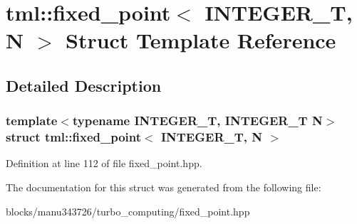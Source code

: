 \hypertarget{structtml_1_1fixed__point}{\section{tml\+:\+:fixed\+\_\+point$<$ I\+N\+T\+E\+G\+E\+R\+\_\+\+T, N $>$ Struct Template Reference}
\label{structtml_1_1fixed__point}
}


\subsection{Detailed Description}
\subsubsection*{template$<$typename I\+N\+T\+E\+G\+E\+R\+\_\+\+T, I\+N\+T\+E\+G\+E\+R\+\_\+\+T N$>$struct tml\+::fixed\+\_\+point$<$ I\+N\+T\+E\+G\+E\+R\+\_\+\+T, N $>$}



Definition at line 112 of file fixed\+\_\+point.\+hpp.



The documentation for this struct was generated from the following file\+:\begin{DoxyCompactItemize}
\item 
blocks/manu343726/turbo\+\_\+computing/fixed\+\_\+point.\+hpp\end{DoxyCompactItemize}
